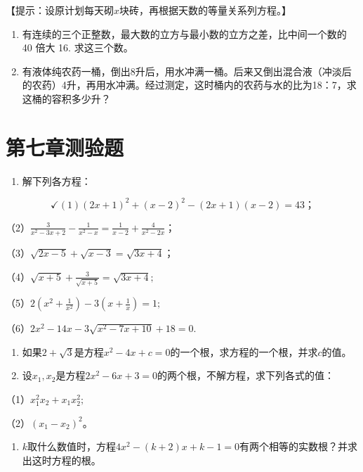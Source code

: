 【提示：设原计划每天砌\(x\)块砖，再根据天数的等量关系列方程。】

\begin{enumerate}[start=13]
\item
  有连续的三个正整数，最大数的立方与最小数的立方之差，比中间一个数的 40
  倍大 16. 求这三个数。
\item
  有液体纯农药一桶，倒出8升后，用水冲满一桶。后来又倒出混合液（冲淡后的农药）4升，再用水冲满。经过测定，这时桶内的农药与水的比为18：7，求这桶的容积多少升？
\end{enumerate}

\section{第七章测验题}

\begin{enumerate}
\item
  解下列各方程：
\end{enumerate}

\[
\checkmark (1) (2 x + 1) ^ {2} + (x - 2) ^ {2} - (2 x + 1) (x - 2) = 43\text{；}
\]

（2）\(\frac{3}{x^2 - 3x + 2} - \frac{1}{x^2 - x} = \frac{1}{x - 2} + \frac{4}{x^2 - 2x}\)；

（3）\(\sqrt{2x - 5} + \sqrt{x - 3} = \sqrt{3x + 4}\)；

（4）\(\sqrt{x + 5} + \frac{3}{\sqrt{x + 5}} = \sqrt{3x + 4};\)

（5）\(2\left(x^{2} + \frac{1}{x^{2}}\right) - 3\left(x + \frac{1}{x}\right) = 1;\)

（6）\(2x^{2} - 14x - 3\sqrt{x^{2} - 7x + 10} + 18 = 0.\)

\begin{enumerate}[start=2]
\item
  如果\(2 + \sqrt{3}\)是方程\(x^{2} - 4x + c = 0\)的一个根，求方程的一个根，并求\(c\)的值。
\item
  设\(x_{1}, x_{2}\)是方程\(2x^{2} - 6x + 3 = 0\)的两个根，不解方程，求下列各式的值：
\end{enumerate}

（1）\(x_{1}^{2}x_{2} + x_{1}x_{2}^{2};\)

（2）\((x_{1} - x_{2})^{2}\)。

\begin{enumerate}[start=4]
\item
  \(k\)取什么数值时，方程\(4x^{2} - (k + 2)x + k - 1 = 0\)有两个相等的实数根？并求出这时方程的根。
\end{enumerate}

